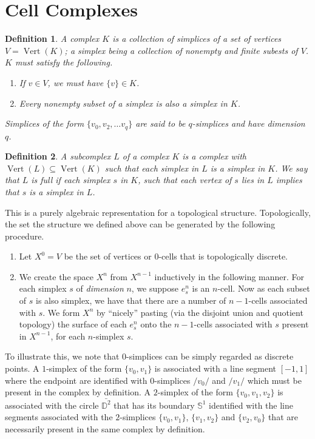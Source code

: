 \documentclass[12pt]{article}
\newtheorem{definition}{Definition}
\theoremstyle{definition}
\numberwithin{equation}{theorem}
\begin{document}
\section{Cell Complexes}

\begin{definition}
  A \emph{complex} $K$ is a collection of \emph{simplices} of a set of vertices $V=\operatorname{Vert}(K)$; a \emph{simplex} being a collection of nonempty and finite subests of $V$. $K$ must satisfy the following.
  \begin{enumerate}
  \item If $v \in V$, we must have $\{v \} \in K$.
  \item Every nonempty subset of a simplex is also a simplex in $K$.
  \end{enumerate}
  Simplices of the form $\{ v_0, v_2, \dots v_q \}$ are said to be $q$-simplices and have \emph{dimension} $q$.
\end{definition}

\begin{definition}
  A \emph{subcomplex} $L$ of a complex $K$ is a complex with $\operatorname{Vert}(L) \subseteq \operatorname{Vert}(K)$ such that each simplex in $L$ is a simplex in $K$. We say that $L$ is \emph{full} if each simplex $s$ in $K$, such that each vertex of $s$ lies in $L$ implies that $s$ is a simplex in $L$.
\end{definition}

This is a purely algebraic representation for a topological structure. Topologically, the set the structure we defined above can be generated by the following procedure.

\begin{enumerate}
\item Let $X^0 = V$ be the set of vertices or $0$-cells that is topologically discrete.
\item We create the space $X^n$ from $X^{n-1}$ inductively in the following manner. For each simplex $s$ of \emph{dimension} $n$, we suppose $e_{s}^n$ is an $n$-cell. Now as each subset of $s$ is also simplex, we have that there are a number of $n-1$-cells associated with $s$. We form $X^n$ by ``nicely'' pasting (via the disjoint union and quotient topology) the surface of each $e^n_s$ onto the $n-1$-cells associated with $s$ present in $X^{n-1}$, for each $n$-simplex $s$.
\end{enumerate}

To illustrate this, we note that $0$-simplices can be simply regarded as discrete points. A $1$-simplex of the form $\{ v_0, v_1 \}$ is associated with a line segment $[-1,1]$ where the endpoint are identified with $0$-simplices $/{v_0 /}$ and $/{v_1 /}$ which must be present in the complex by definition. A $2$-simplex of the form $\{ v_0,v_1,v_2 \}$ is associated with the circle $\bar{\mathbb{D}^2}$ that has its boundary $\mathbb{S}^1$ identified with the line segments associated with the $2$-simplices $\{ v_0,v_1 \}$, $\{ v_1,v_2 \}$ and $\{ v_2,v_0 \}$ that are necessarily present in the same complex by definition.
\end{document}
